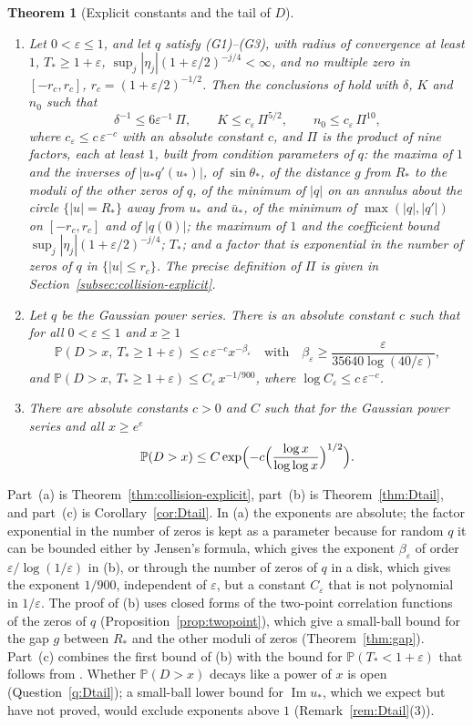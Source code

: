\documentclass[11pt]{amsart}
\newtheorem{theorem}{Theorem}[section]
\theoremstyle{definition}
\theoremstyle{remark}
\numberwithin{equation}{section}
\newcommand{\PP}{\mathbb{P}}
\newcommand{\eps}{\varepsilon}
\DeclareMathOperator{\im}{Im}
\begin{document}
\begin{theorem}[Explicit constants and the tail of $D$]\label{thm:explicit-intro}
\begin{enumerate}
\item[(a)] Let $0<\eps\le1$, and let $q$ satisfy (G1)--(G3), with radius of convergence at least $1$, $T_*\ge1+\eps$, $\sup_j|\eta_j|(1+\eps/2)^{-j/4}<\infty$, and no multiple zero in $[-r_c,r_c]$, $r_c=(1+\eps/2)^{-1/2}$. Then the conclusions of \cite[Theorem~\ref{M-thm:collision}]{Main} hold with $\delta$, $K$ and $n_0$ such that
\[
\delta^{-1}\le6\eps^{-1}\,\Pi,\qquad K\le c_\eps\,\Pi^{5/2},\qquad n_0\le c_\eps\,\Pi^{10},
\]
where $c_\eps\le c\,\eps^{-c}$ with an absolute constant $c$, and $\Pi$ is the product of nine factors, each at least $1$, built from condition parameters of $q$: the maxima of $1$ and the inverses of $|u_*q'(u_*)|$, of $\sin\theta_*$, of the distance $g$ from $R_*$ to the moduli of the other zeros of $q$, of the minimum of $|q|$ on an annulus about the circle $\{|u|=R_*\}$ away from $u_*$ and $\bar u_*$, of the minimum of $\max(|q|,|q'|)$ on $[-r_c,r_c]$ and of $|q(0)|$; the maximum of $1$ and the coefficient bound $\sup_j|\eta_j|(1+\eps/2)^{-j/4}$; $T_*$; and a factor that is exponential in the number of zeros of $q$ in $\{|u|\le r_c\}$. The precise definition of $\Pi$ is given in Section~\ref{subsec:collision-explicit}.
\item[(b)] Let $q$ be the Gaussian power series. There is an absolute constant $c$ such that for all $0<\eps\le1$ and $x\ge1$
\[
\PP(D>x,\ T_*\ge1+\eps)\le c\,\eps^{-c}x^{-\beta_\eps}\quad\text{with}\quad\beta_\eps\ge\frac{\eps}{35640\log(40/\eps)},
\]
and $\PP(D>x,\ T_*\ge1+\eps)\le C_\eps\,x^{-1/900}$, where $\log C_\eps\le c\,\eps^{-c}$.
\item[(c)] There are absolute constants $c>0$ and $C$ such that for the Gaussian power series and all $x\ge e^e$
\[
\PP(D>x)\le C\exp\Bigl(-c\Bigl(\frac{\log x}{\log\log x}\Bigr)^{1/2}\Bigr).
\]
\end{enumerate}
\end{theorem}

Part~(a) is Theorem~\ref{thm:collision-explicit}, part~(b) is Theorem~\ref{thm:Dtail}, and part~(c) is Corollary~\ref{cor:Dtail}. In (a) the exponents are absolute; the factor exponential in the number of zeros is kept as a parameter because for random $q$ it can be bounded either by Jensen's formula, which gives the exponent $\beta_\eps$ of order $\eps/\log(1/\eps)$ in (b), or through the number of zeros of $q$ in a disk, which gives the exponent $1/900$, independent of $\eps$, but a constant $C_\eps$ that is not polynomial in $1/\eps$. The proof of (b) uses closed forms of the two-point correlation functions of the zeros of $q$ (Proposition~\ref{prop:twopoint}), which give a small-ball bound for the gap $g$ between $R_*$ and the other moduli of zeros (Theorem~\ref{thm:gap}). Part~(c) combines the first bound of (b) with the bound for $\PP(T_*<1+\eps)$ that follows from \cite[Theorem~\ref{M-thm:sharp}]{Main}. Whether $\PP(D>x)$ decays like a power of $x$ is open (Question~\ref{q:Dtail}); a small-ball lower bound for $\im u_*$, which we expect but have not proved, would exclude exponents above $1$ (Remark~\ref{rem:Dtail}(3)).
\end{document}

